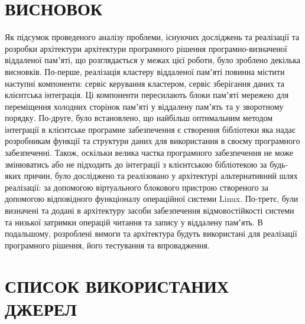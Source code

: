 \documentclass[14pt]{article}
\begin{document}
\chapter{ВИСНОВОК}

Як підсумок проведеного аналізу проблеми, існуючих досліджень та реалізації та розробки архітектури архітектури програмного рішення програмно-визначеної віддаленої памʼяті, що розглядається у межах цієї роботи, було зроблено декілька висновків.
По-перше, реалізація кластеру віддаленої памʼяті повинна містити наступні компоненти: сервіс керування кластером, сервіс зберігання даних та клієнтська інтеграція. Ці компоненти пересилають блоки памʼяті мережею для переміщення холодних сторінок памʼяті у віддалену памʼять та у зворотному порядку.
По-друге, було встановлено, що найбільш оптимальним методом інтеграції в клієнтське програмне забезпечення є створення бібліотеки яка надає розробникам функції та структури даних для використання в своєму програмного забезпеченні. Також, оскільки велика частка програмного забезпечення не може змінюватись або не підходить до інтеграції з клієнтською бібліотекою за будь-яких причин, було досліджено та реалізовано у архітектурі альтернативний шлях реалізації: за допомогою віртуального блокового пристрою створеного за допомогою відповідного функціоналу операційної системи Linux.
По-третє, були визначені та додані в архітектуру засоби забезпечення відмовостійкості системи та низької затримки операцій читання та запису у віддалену памʼять.
В подальшому, розроблені вимоги та архітектура будуть використані для реалізації програмного рішення, його тестування та впровадження. 

\chapter {СПИСОК ВИКОРИСТАНИХ ДЖЕРЕЛ}
\end{document}
